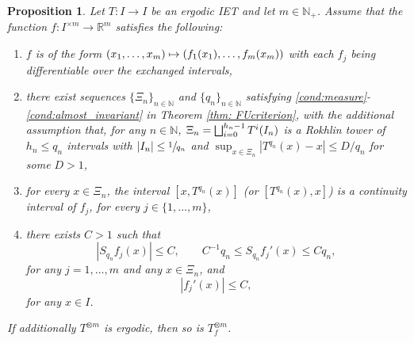 \documentclass[JEP,XML,SOM,Unicode,NoEqCountersInSection,NoFloatCountersInSection,published]{cedram}
\newenvironment{enumeratei}
{\bgroup\def\theenumi{\roman{enumi}}\def\theenumii{\arabic{enumii}}\begin{enumerate}}
{\end{enumerate}\egroup}
\newcommand\mto{\mathchoice{\longmapsto}{\mapsto}{\mapsto}{\mapsto}}
\let\oldbigsqcup\bigsqcup
\renewcommand{\bigsqcup}{\mathop{\textstyle\oldbigsqcup}\displaylimits}
\theoremstyle{plain}
\newtheorem{proposition}[theorem]{Proposition}
\theoremstyle{definition}
\newcommand{\N}{\mathbb{N}}
\newcommand{\R}{\mathbb{R}}
\begin{document}
\begin{proposition}\label{prop: effcriterion}
Let $T:I\to I$ be an ergodic IET and let $m\in \N_+$. Assume that the function $f:I^{\times m}\to \R^{m}$ satisfies the following:
\begin{enumeratei}
\item \label{cond:continuity} $f$ is of the form $(x_1,\ldots,x_m)\mto (f_1(x_1),\ldots,f_m(x_m))$ with each $f_j$ being differentiable over the exchanged intervals,
\item \label{cond:sequences} there exist sequences $\{\Xi_n\}_{n\in\N}$ and $\{q_n\}_{n\in\N}$ satisfying \eqref{cond:measure}-\eqref{cond:almost_invariant} in Theorem \ref{thm: FUcriterion}, with the additional assumption that, for any $n \in \N$, $\Xi_n=\bigsqcup_{i=0}^{h_n-1}T^{i}({I_n})$ is a Rokhlin tower of $h_n\le q_n$ intervals with $|I_n|\le\sfrac{1}{q_n}$ and $\sup_{x\in \Xi_n}|T^{q_n}(x)-x|\le D/q_n$ for some $D>1$,
\item \label{cond:cont_interval} for every $x\in\Xi_n$, the interval $[x,T^{q_n}(x)]$ (or $[T^{q_n}(x),x]$) is a continuity interval of $f_j$, for every $j\in\{1,\ldots,m\}$,
\item \label{cond:derivative} there exists $C>1$ such that
\[
|S_{q_n}f_j(x)|\le C, \qquad C^{-1}q_n\le S_{q_n}f_j'(x)\le Cq_n,
\]
for any $j=1,\ldots,m$ and any $x\in\Xi_n$, and
\[
|f_j'(x)|\le C,
\]
for any $x\in I$.
\end{enumeratei}
If additionally $T^{\otimes m}$ is ergodic, then so is $T_f^{\otimes m}$.
\end{proposition}
\end{document}
